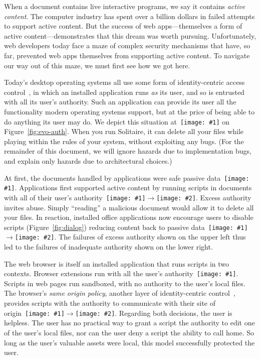 \documentclass[letterpaper,twocolumn,10pt]{article}
\newcommand{\q}[1]{{\texttt{[image: \#1]}}}
\newcommand{\qq}[2]{{\texttt{[image: \#1]}}$\rightarrow${\texttt{[image: \#2]}}}
\begin{document}
When a document contains live interactive programs, we say it contains 
\emph{active content}. The computer industry has spent over a billion dollars 
in failed attempts to support active content. But the success of web 
apps---themselves a form of active content---demonstrates that this dream was 
worth pursuing. Unfortunately, web developers today face a maze of complex 
security mechanisms that have, so far, prevented web apps themselves from 
supporting active content. To navigate our way out of this maze, we must 
first see how we got here.

Today's desktop operating systems all use some form of identity-centric 
access control~\cite{karp:abac-soa}, in which an installed application runs 
\emph{as} its user, and so is entrusted with all its user's authority. Such 
an application can provide its user all the functionality modern operating 
systems support, but at the price of being able to do anything its user may 
do. We depict this situation at~\q{2} on Figure~\ref{fig:evo-auth}. When you 
run Solitaire, it can delete all your files while playing within the rules of 
your system, without exploiting any bugs. (For the remainder of this 
document, we will ignore hazards due to implementation bugs, and explain only 
hazards due to architectural choices.)

At first, the documents handled by applications were safe passive data~\q{1}. 
Applications first supported active content by running scripts in documents 
with all of their user's authority~\qq{1}{2}. Excess authority invites abuse. 
Simply ``reading'' a malicious document would allow it to delete all your 
files. In reaction, installed office applications now encourage users to 
disable scripts (Figure~\ref{fig:dialog}) reducing content back to passive 
data~\qq{2}{1}. The failures of excess authority shown on the upper left thus 
led to the failures of inadequate authority shown on the lower right.

The web browser is itself an installed application that runs scripts in two 
contexts. Browser extensions run with all the user's authority~\q{2}. Scripts 
in web pages run sandboxed, with no authority to the user's local files. The 
browser's \emph{same origin policy}, another layer of identity-centric 
control~\cite{mashupos}, provides scripts with the authority to communicate 
with their site of origin~\qq{1}{3}. Regarding both decisions, the user is 
helpless. The user has no practical way to grant a script the authority to 
edit one of the user's local files, nor can the user deny a script the 
ability to call home. So long as the user's valuable assets were local, this 
model successfully protected the user.
\end{document}
